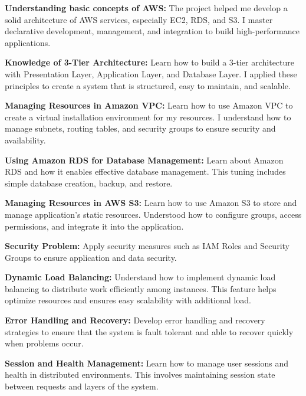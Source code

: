 \documentclass{article}
\begin{document}
\textbf{Understanding basic concepts of AWS:} The project helped me develop a solid architecture of AWS services, especially EC2, RDS, and S3. I master declarative development, management, and integration to build high-performance applications.\par

\textbf{Knowledge of 3-Tier Architecture:} Learn how to build a 3-tier architecture with Presentation Layer, Application Layer, and Database Layer. I applied these principles to create a system that is structured, easy to maintain, and scalable.\par

\textbf{Managing Resources in Amazon VPC:} Learn how to use Amazon VPC to create a virtual installation environment for my resources. I understand how to manage subnets, routing tables, and security groups to ensure security and availability.\par

\textbf{Using Amazon RDS for Database Management:} Learn about Amazon RDS and how it enables effective database management. This tuning includes simple database creation, backup, and restore.\par

\textbf{Managing Resources in AWS S3:} Learn how to use Amazon S3 to store and manage application's static resources. Understood how to configure groups, access permissions, and integrate it into the application.\par

\textbf{Security Problem:} Apply security measures such as IAM Roles and Security Groups to ensure application and data security.\par

\textbf{Dynamic Load Balancing:} Understand how to implement dynamic load balancing to distribute work efficiently among instances. This feature helps optimize resources and ensures easy scalability with additional load.\par

\textbf{Error Handling and Recovery:} Develop error handling and recovery strategies to ensure that the system is fault tolerant and able to recover quickly when problems occur.\par

\textbf{Session and Health Management:} Learn how to manage user sessions and health in distributed environments. This involves maintaining session state between requests and layers of the system.\par
\end{document}
